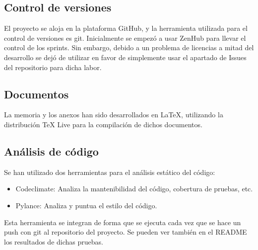 \subsection{Control de versiones}

El proyecto se aloja en la plataforma GitHub, y la herramienta utilizada para el control de versiones es git.
Inicialmente se empezó a usar ZenHub para llevar el control de los sprints. Sin embargo, debido a un problema de 
licencias a mitad del desarrollo se dejó de utilizar en favor de simplemente usar el apartado de Issues del repositorio 
para dicha labor.

\subsection{Documentos}

La memoria y los anexos han sido desarrollados en LaTeX, utilizando la distribución TeX Live\cite{texlive} para la
compilación de dichos documentos.

\subsection{Análisis de código}

Se han utilizado dos herramientas para el análisis estático del código:
\begin{itemize}
    \item Codeclimate: Analiza la mantenibilidad del código, cobertura de pruebas, etc.
    \item Pylance: Analiza y puntua el estilo del código.
\end{itemize}

Esta herramienta se integran de forma que se ejecuta cada vez que se hace un push con git al repositorio del proyecto.
Se pueden ver también en el README los resultados de dichas pruebas.